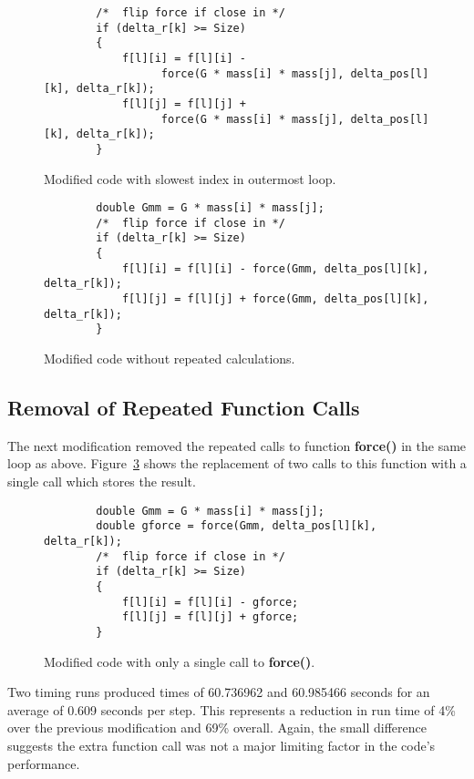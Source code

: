 \documentclass[11pt, oneside]{article}   %
\begin{document}
\begin{figure}
	\begin{lstlisting}
		/*  flip force if close in */
		if (delta_r[k] >= Size)
		{
			f[l][i] = f[l][i] -
				  force(G * mass[i] * mass[j], delta_pos[l][k], delta_r[k]);
			f[l][j] = f[l][j] +
				  force(G * mass[i] * mass[j], delta_pos[l][k], delta_r[k]);
		}
	\end{lstlisting}
	\caption{Modified code with slowest index in outermost loop.}
	\label{figure:GmmOrig}
\end{figure}

\begin{figure}
	\begin{lstlisting}
		double Gmm = G * mass[i] * mass[j];
		/*  flip force if close in */
		if (delta_r[k] >= Size)
		{
			f[l][i] = f[l][i] - force(Gmm, delta_pos[l][k], delta_r[k]);
			f[l][j] = f[l][j] + force(Gmm, delta_pos[l][k], delta_r[k]);
		}
	\end{lstlisting}
	\caption{Modified code without repeated calculations.}
	\label{figure:GmmMod}
\end{figure}

\subsection{Removal of Repeated Function Calls}
The next modification removed the repeated calls to function \textbf{force()} in the same loop as above.
Figure~\ref{figure:ForceMod} shows the replacement of two calls to this function with a single call which stores the result.

\begin{figure}
	\begin{lstlisting}
		double Gmm = G * mass[i] * mass[j];
		double gforce = force(Gmm, delta_pos[l][k], delta_r[k]);
		/*  flip force if close in */
		if (delta_r[k] >= Size)
		{
			f[l][i] = f[l][i] - gforce;
			f[l][j] = f[l][j] + gforce;
		}
	\end{lstlisting}
	\caption{Modified code with only a single call to \textbf{force()}.}
	\label{figure:ForceMod}
\end{figure}

Two timing runs produced times of 60.736962 and 60.985466 seconds for an average of 0.609 seconds per step.
This represents a reduction in run time of 4\% over the previous modification and 69\% overall.
Again, the small difference suggests the extra function call  was not a major limiting factor in the code's performance.
\end{document}
